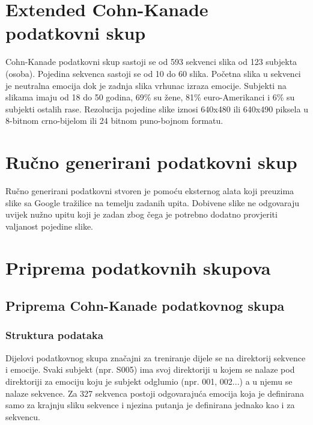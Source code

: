 \documentclass[times, utf8, zavrsni,numeric]{fer}
\begin{document}
\section{Extended Cohn-Kanade podatkovni skup}

Cohn-Kanade podatkovni skup sastoji se od 593 sekvenci slika od 123 subjekta (osoba). Pojedina sekvenca sastoji se od 10 do 60 slika. Početna slika u sekvenci je neutralna emocija dok je zadnja slika vrhunac izraza emocije. Subjekti na slikama imaju od 18 do 50 godina, 69\% su žene, 81\% euro-Amerikanci i 6\% su subjekti ostalih rase. Rezolucija pojedine slike iznosi 640x480 ili 640x490 piksela u 8-bitnom crno-bijelom ili 24 bitnom puno-bojnom formatu.\cite{ck}

\section{Ručno generirani podatkovni skup}
Ručno generirani podatkovni stvoren je pomoću eksternog alata koji preuzima slike sa Google tražilice na temelju zadanih upita. Dobivene slike ne odgovaraju uvijek nužno upitu koji je zadan zbog čega je potrebno dodatno provjeriti valjanost pojedine slike.


\section{Priprema podatkovnih skupova}
\subsection{Priprema Cohn-Kanade podatkovnog skupa}
\subsubsection{Struktura podataka}

Dijelovi podatkovnog skupa značajni za treniranje dijele se na direktorij sekvence i emocije. Svaki subjekt (npr. S005) ima svoj direktoriji u kojem se nalaze pod direktoriji za emociju koju je subjekt odglumio (npr. 001, 002...) a u njemu se nalaze sekvence. Za 327 sekvenca postoji odgovarajuća emocija koja je definirana samo za krajnju sliku sekvence i njezina putanja je definirana jednako kao i za sekvencu.

\pagebreak
\end{document}
